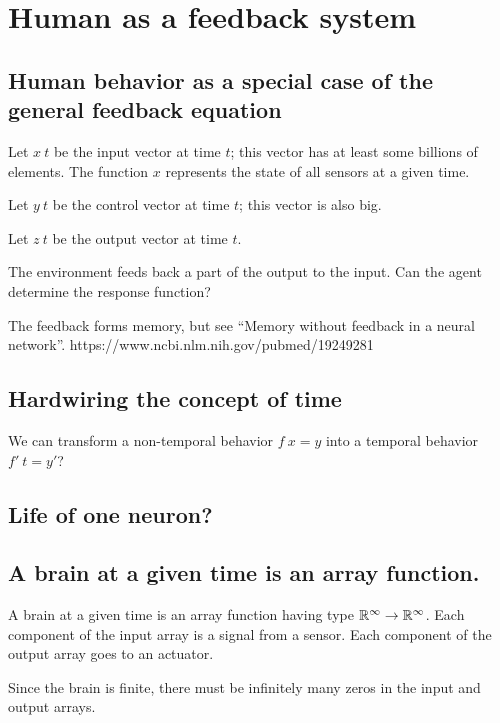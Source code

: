 \chapter{Human as a feedback system}

\section{Human behavior as a special case of the general feedback equation}

Let \(x ~ t\) be the input vector at time \(t\);
this vector has at least some billions of elements.
The function \(x\) represents the state of all sensors at a given time.

Let \(y ~ t\) be the control vector at time \(t\);
this vector is also big.

Let \(z~t\) be the output vector at time \(t\).

The environment feeds back a part of the output to the input.
Can the agent determine the response function?

The feedback forms memory, but see ``Memory without feedback in a neural network''.
https://www.ncbi.nlm.nih.gov/pubmed/19249281

\section{Hardwiring the concept of time}

We can transform a non-temporal behavior \(f~x = y\) into a temporal behavior \(f'~t = y'\)?

\section{Life of one neuron?}


\section{A brain at a given time is an array function.}

A brain at a given time is an array function
having type \(\mathbb{R}^\infty \to \mathbb{R}^\infty\).
Each component of the input array is a signal from a sensor.
Each component of the output array goes to an actuator.

Since the brain is finite,
there must be infinitely many zeros in the input and output arrays.

